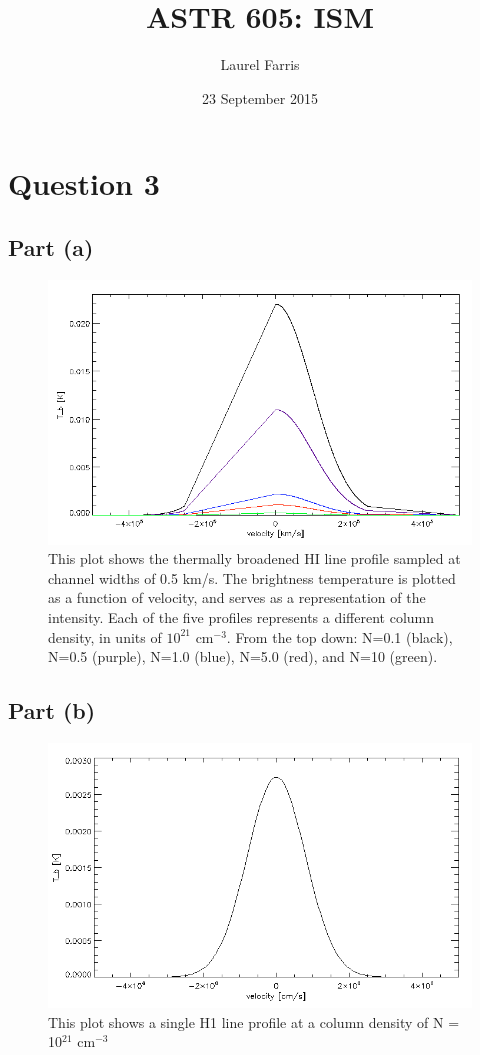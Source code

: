 \documentclass[12pt]{article}
\title{ASTR 605: ISM}
\author{Laurel Farris}
\date{23 September 2015}
\begin{document}

\maketitle


\section{Question 3}
\subsection{Part (a)}


\begin{figure}[h]   %
\centering
\includegraphics[width=5.0in]{plot_a.png}
\caption{This plot shows the thermally broadened 
 HI line profile sampled at channel widths of 
0.5 km/s. The brightness temperature is plotted as a function of velocity, 
and serves as a representation of the intensity. Each of the five
 profiles represents a different column density, in units of 
$10^{21}$ cm$^{-3}$. From the top down: N=0.1 (black), N=0.5 (purple), 
N=1.0 (blue), N=5.0 (red), and N=10 (green). }
\label{plot_a}
\end{figure}


\newpage  %
\subsection{Part (b)}
\begin{figure}[h]   %
\centering
\includegraphics[width=5.0in]{partb.png}
\caption{This plot shows a single H1 line profile at a column density
of N = 10$^{21}$ cm$^{-3}$}
\label{plot_b}
\end{figure}
\end{document}
